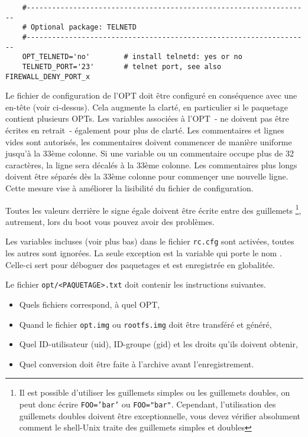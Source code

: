 \begin{example}
\begin{verbatim}
    #-------------------------------------------------------------------
    # Optional package: TELNETD
    #-------------------------------------------------------------------
    OPT_TELNETD='no'        # install telnetd: yes or no
    TELNETD_PORT='23'       # telnet port, see also FIREWALL_DENY_PORT_x
\end{verbatim}
\end{example}

Le fichier de configuration de l'OPT doit être configuré en conséquence avec une
en-tête (voir ci-dessus). Cela augmente la clarté, en particulier si le paquetage
contient plusieurs OPTs. Les variables associées à l'OPT~- ne doivent pas être écrites
en retrait~- également pour plus de clarté. Les commentaires et lignes vides sont
autorisés, les commentaires doivent commencer de manière uniforme jusqu'à la 33ème colonne.
Si une variable ou un commentaire occupe plus de 32 caractères, la ligne sera décalés
à la 33ème colonne. Les commentaires plus longs doivent être séparés dès la 33ème colonne
pour commençer une nouvelle ligne. Cette mesure vise à améliorer la lisibilité du fichier
de configuration.

Toutes les valeurs derrière le signe égale doivent être écrite entre des guillemets
\footnote{Il est possible d'utiliser les guillemets simples ou les guillemets doubles,
on peut donc écrire \texttt{FOO='bar'} ou \texttt{FOO="bar"}. Cependant, l'utilisation des
guillemets doubles doivent être exceptionnelle, vous devez vérifier absolument comment
le shell-Unix traite des guillemets simples et doubles}, autrement, lors du boot vous
pouvez avoir des problèmes.

    Les variables incluses (voir plus bas) dans le fichier \texttt{rc.cfg} sont activées,
    toutes les autres sont ignorées. La seule exception est la variable qui porte le nom
	. Celle-ci sert pour déboguer des paquetages et est
	enregistrée en globalitée.



    Le fichier \texttt{opt/<PAQUETAGE>.txt} doit contenir les instructions suivantes.

\begin{itemize}
\item Quels fichiers correspond, à quel OPT,
\item Quand le fichier \texttt{opt.img} ou \texttt{rootfs.img} doit être transféré
	 et généré,
\item Quel ID-utilisateur (uid), ID-groupe (gid) et les droits qu'ils doivent obtenir,
\item Quel conversion doit être faite à l'archive avant l'enregistrement.

\end{itemize}

